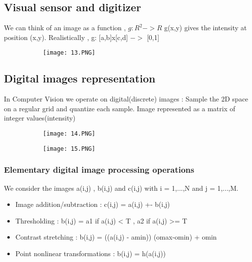 \documentclass{article}
\begin{document}
\subsection{Visual sensor and digitizer}

We can think of an image as a function , $g : R^2 -> R$ g(x,y) gives the intensity at position (x,y). Realistically , g: [a,b]x[c,d] $->$ [0,1]

\begin{figure}[ht!]
  \centering
  \begin{subfigure}[b]{0.4\linewidth}
    \texttt{[image: 13.PNG]}
  \end{subfigure}
\end{figure}
\vspace{60mm}
\subsection{Digital images representation}

In Computer Vision we operate on digital(discrete) images : Sample the 2D space on a regular grid and quantize each sample.
Image represented as a matrix of integer values(intensity)


\begin{figure}[ht!]
  \centering
  \begin{subfigure}[b]{0.4\linewidth}
    \texttt{[image: 14.PNG]}
  \end{subfigure}
  \begin{subfigure}[b]{0.4\textwidth}
         \centering
         \texttt{[image: 15.PNG]}
     \end{subfigure}
\end{figure}

\subsubsection{Elementary digital image processing operations}

We consider the images a(i,j) , b(i,j) and c(i,j) with i = 1,...,N and j = 1,...,M.

\begin{itemize}
    \item Image addition/subtraction : c(i,j) = a(i,j) +- b(i,j)
    \item Thresholding : b(i,j) = a1 if a(i,j) < T , a2 if a(i,j) >= T
    \item Contrast stretching : b(i,j) = ((a(i,j) - amin)) (omax-omin) + omin
    \item Point nonlinear transformations : b(i,j) = h(a(i,j))
\end{itemize}
\end{document}
